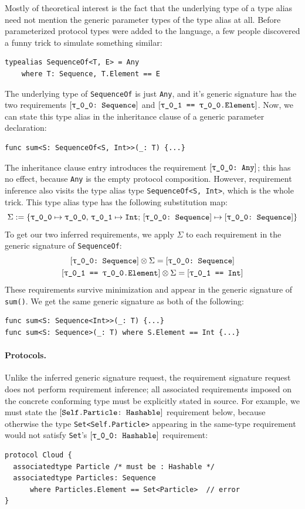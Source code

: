 \documentclass[../generics]{subfiles}
\begin{document}
Mostly of theoretical interest is the fact that the underlying type of a type alias need not mention the generic parameter types of the type alias at all. Before parameterized protocol types were added to the language, a few people discovered a funny trick to simulate something similar:
\begin{Verbatim}
typealias SequenceOf<T, E> = Any
    where T: Sequence, T.Element == E
\end{Verbatim}
The underlying type of \texttt{SequenceOf} is just \texttt{Any}, and it's generic signature has the two requirements $\rTSequence$ and $\SameReq{\rU}{\rT.Element}$. Now, we can state this type alias in the inheritance clause of a generic parameter declaration:
\begin{Verbatim}
func sum<S: SequenceOf<S, Int>>(_: T) {...}
\end{Verbatim}
The inheritance clause entry introduces the requirement $\ConfReq{\rT}{Any}$; this has no effect, because \texttt{Any} is the empty protocol composition. However, requirement inference also visits the type alias type \texttt{SequenceOf<S, Int>}, which is the whole trick. This type alias type has the following substitution map:
\[
\Sigma := \SubstMapC{
\SubstType{\rT}{\rT},\,\SubstType{\rU}{Int}
}{\SubstConf{\rT}{\rT}{Sequence}}
\]
To get our two inferred requirements, we apply $\Sigma$ to each requirement in the generic signature of \texttt{SequenceOf}:
\begin{gather*}
\rTSequence\otimes\Sigma = \rTSequence\\
\SameReq{\rU}{\rT.Element}\otimes\Sigma = \SameReq{\rU}{Int}
\end{gather*}
These requirements survive minimization and appear in the generic signature of \texttt{sum()}. We get the same generic signature as both of the following:
\begin{Verbatim}
func sum<S: Sequence<Int>>(_: T) {...}
func sum<S: Sequence>(_: T) where S.Element == Int {...}
\end{Verbatim}

\paragraph{Protocols.}
Unlike the inferred generic signature request, the requirement signature request does not perform requirement inference; all associated requirements imposed on the concrete conforming type must be explicitly stated in source. For example, we must state the $[\texttt{Self.Particle:~Hashable}]$ requirement below, because otherwise the type \texttt{Set<Self.Particle>} appearing in the same-type requirement would not satisfy \texttt{Set}'s $\ConfReq{\rT}{Hashable}$ requirement:
\begin{Verbatim}
protocol Cloud {
  associatedtype Particle /* must be : Hashable */
  associatedtype Particles: Sequence
      where Particles.Element == Set<Particle>  // error
}
\end{Verbatim}
\end{document}
